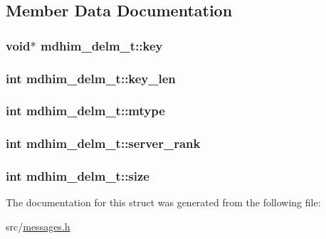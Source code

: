 \subsection{Member Data Documentation}
\hypertarget{structmdhim__delm__t_acedac9daad7ab8b9870f8c7c2a471ced}{
\subsubsection[{key}]{\setlength{\rightskip}{0pt plus 5cm}void$\ast$ mdhim\-\_\-delm\-\_\-t\-::key}}\label{d7/da5/structmdhim__delm__t_acedac9daad7ab8b9870f8c7c2a471ced}
\hypertarget{structmdhim__delm__t_aed818ed56728fe40acd3567fce5a2fb5}{
\subsubsection[{key\-\_\-len}]{\setlength{\rightskip}{0pt plus 5cm}int mdhim\-\_\-delm\-\_\-t\-::key\-\_\-len}}\label{d7/da5/structmdhim__delm__t_aed818ed56728fe40acd3567fce5a2fb5}
\hypertarget{structmdhim__delm__t_aed97225c8df041600c6b5fffb43a1bbc}{
\subsubsection[{mtype}]{\setlength{\rightskip}{0pt plus 5cm}int mdhim\-\_\-delm\-\_\-t\-::mtype}}\label{d7/da5/structmdhim__delm__t_aed97225c8df041600c6b5fffb43a1bbc}
\hypertarget{structmdhim__delm__t_a00480044a106cf24c63e03b3d15320dc}{
\subsubsection[{server\-\_\-rank}]{\setlength{\rightskip}{0pt plus 5cm}int mdhim\-\_\-delm\-\_\-t\-::server\-\_\-rank}}\label{d7/da5/structmdhim__delm__t_a00480044a106cf24c63e03b3d15320dc}
\hypertarget{structmdhim__delm__t_a72a3a5a840b005517685ab4a5f9e101e}{
\subsubsection[{size}]{\setlength{\rightskip}{0pt plus 5cm}int mdhim\-\_\-delm\-\_\-t\-::size}}\label{d7/da5/structmdhim__delm__t_a72a3a5a840b005517685ab4a5f9e101e}


The documentation for this struct was generated from the following file\-:\begin{DoxyCompactItemize}
\item 
src/\hyperlink{messages_8h}{messages.\-h}\end{DoxyCompactItemize}

